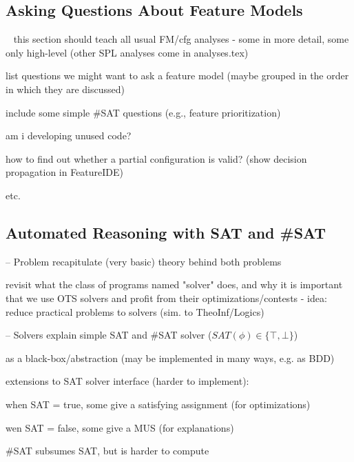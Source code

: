 \subsection{Asking Questions About Feature Models}


\begin{frame}{~}
	this section should teach all usual FM/cfg analyses - some in more detail, some only high-level (other SPL analyses come in analyses.tex)

	list questions we might want to ask a feature model (maybe grouped in the order in which they are discussed)

	include some simple \#SAT questions (e.g., feature prioritization)

	am i developing unused code?

	how to find out whether a partial configuration is valid? (show decision propagation in FeatureIDE)

	etc.
\end{frame}

\subsection{Automated Reasoning with SAT and \#SAT}

\begin{frame}{-- Problem}
	recapitulate (very basic) theory behind both problems

	revisit what the class of programs named "solver" does, and why it is important that we use OTS solvers and profit from their optimizations/contests - idea: reduce practical problems to solvers (sim. to TheoInf/Logics)
\end{frame}

\begin{frame}{-- Solvers}
	explain simple SAT and \#SAT solver ($SAT(\phi) \in \{\top, \bot\}$)

	as a black-box/abstraction (may be implemented in many ways, e.g. as BDD)

	extensions to SAT solver interface (harder to implement):
	
	when SAT = true, some give a satisfying assignment (for optimizations)
	
	wen SAT = false, some give a MUS (for explanations) %

	\#SAT subsumes SAT, but is harder to compute
\end{frame}

